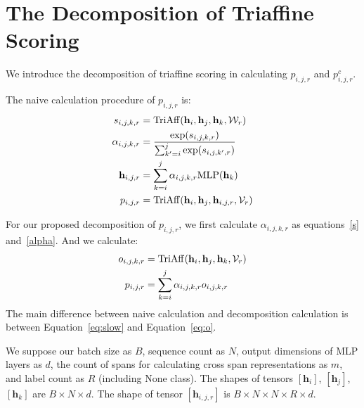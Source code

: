 \documentclass[11pt]{article}
\begin{document}
\section{The Decomposition of Triaffine Scoring}
\label{appendix:decompose}
We introduce the decomposition of triaffine scoring in calculating $p_{i,j,r}$ and $p_{i,j,r}^c$.

The naive calculation procedure of $p_{i,j,r}$ is:
\begin{align}
    s_{i,j,k,r} &= {\rm TriAff}(\mathbf{h}_i, \mathbf{h}_j, \mathbf{h}_k, {\mathcal W}_r)
    \label{s} \\
    \alpha_{i,j,k,r} &= \frac{\exp(s_{i,j,k,r})}{\sum_{k'=i}^j \exp (s_{i,j,k',r})}
    \label{alpha} \\
    \mathbf{h}_{i,j,r} &= \sum_{k=i}^j\alpha_{i,j,k,r}{\rm MLP}(\mathbf{h}_k)
\label{attn} \\
    p_{i,j,r} &= {\rm TriAff}(\mathbf{h}_i, \mathbf{h}_j, \mathbf{h}_{i,j,r}, {\mathcal V}_r)
    \label{eq:slow}
\end{align}

For our proposed decomposition of $p_{i,j,r}$, we first calculate $\alpha_{i,j,k,r}$ as equations~\ref{s} and~\ref{alpha}. And we calculate:
\begin{align}
    o_{i,j,k,r} &= {\rm TriAff}(\mathbf{h}_i, \mathbf{h}_j, \mathbf{h}_k, {\mathcal V}_r)
    \label{eq:o} \\
    p_{i,j,r} &= \sum_{k=i}^j \alpha_{i,j,k,r}o_{i,j,k,r}
    \label{eq:decompose}
\end{align}
The main difference between naive calculation and decomposition calculation is between Equation~\ref{eq:slow} and Equation~\ref{eq:o}.


We suppose our batch size as $B$, sequence count as $N$, output dimensions of MLP layers as $d$, the count of spans for calculating cross span representations as $m$, and label count as $R$ (including None class). 
The shapes of tensors $[\mathbf{h}_i]$, $[\mathbf{h}_j]$, $[\mathbf{h}_k]$ are $B \times N \times d$.
The shape of tensor $[\mathbf{h}_{i,j,r}]$ is $B \times N \times N \times R \times d$.
\end{document}
